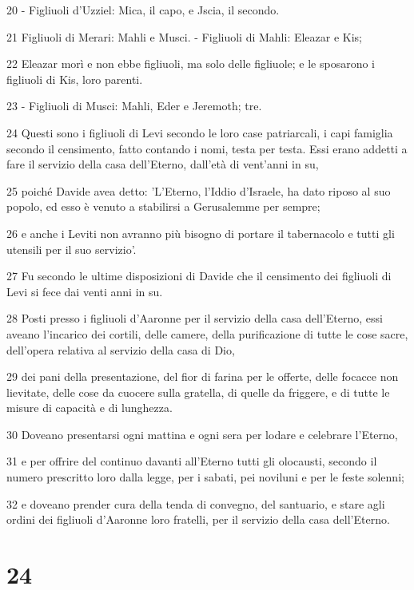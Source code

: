 \par 20 - Figliuoli d'Uzziel: Mica, il capo, e Jscia, il secondo.
\par 21 Figliuoli di Merari: Mahli e Musci. - Figliuoli di Mahli: Eleazar e Kis;
\par 22 Eleazar morì e non ebbe figliuoli, ma solo delle figliuole; e le sposarono i figliuoli di Kis, loro parenti.
\par 23 - Figliuoli di Musci: Mahli, Eder e Jeremoth; tre.
\par 24 Questi sono i figliuoli di Levi secondo le loro case patriarcali, i capi famiglia secondo il censimento, fatto contando i nomi, testa per testa. Essi erano addetti a fare il servizio della casa dell'Eterno, dall'età di vent'anni in su,
\par 25 poiché Davide avea detto: 'L'Eterno, l'Iddio d'Israele, ha dato riposo al suo popolo, ed esso è venuto a stabilirsi a Gerusalemme per sempre;
\par 26 e anche i Leviti non avranno più bisogno di portare il tabernacolo e tutti gli utensili per il suo servizio'.
\par 27 Fu secondo le ultime disposizioni di Davide che il censimento dei figliuoli di Levi si fece dai venti anni in su.
\par 28 Posti presso i figliuoli d'Aaronne per il servizio della casa dell'Eterno, essi aveano l'incarico dei cortili, delle camere, della purificazione di tutte le cose sacre, dell'opera relativa al servizio della casa di Dio,
\par 29 dei pani della presentazione, del fior di farina per le offerte, delle focacce non lievitate, delle cose da cuocere sulla gratella, di quelle da friggere, e di tutte le misure di capacità e di lunghezza.
\par 30 Doveano presentarsi ogni mattina e ogni sera per lodare e celebrare l'Eterno,
\par 31 e per offrire del continuo davanti all'Eterno tutti gli olocausti, secondo il numero prescritto loro dalla legge, per i sabati, pei noviluni e per le feste solenni;
\par 32 e doveano prender cura della tenda di convegno, del santuario, e stare agli ordini dei figliuoli d'Aaronne loro fratelli, per il servizio della casa dell'Eterno.

\chapter{24}

